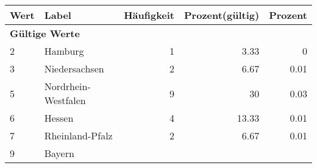      \begin{longtable}{lXrrr}
     \toprule
     \textbf{Wert} & \textbf{Label} & \textbf{Häufigkeit} & \textbf{Prozent(gültig)} & \textbf{Prozent} \\
     \endhead
     \midrule
     \multicolumn{5}{l}{\textbf{Gültige Werte}}\\

     2 &
     \multicolumn{1}{X}{ Hamburg   } &


       \num{1} &
       \num[round-mode=places,round-precision=2]{3,33} &
         \num[round-mode=places,round-precision=2]{0} \\

     3 &
     \multicolumn{1}{X}{ Niedersachsen   } &


       \num{2} &
       \num[round-mode=places,round-precision=2]{6,67} &
         \num[round-mode=places,round-precision=2]{0,01} \\

     5 &
     \multicolumn{1}{X}{ Nordrhein-Westfalen   } &


       \num{9} &
       \num[round-mode=places,round-precision=2]{30} &
         \num[round-mode=places,round-precision=2]{0,03} \\

     6 &
     \multicolumn{1}{X}{ Hessen   } &


       \num{4} &
       \num[round-mode=places,round-precision=2]{13,33} &
         \num[round-mode=places,round-precision=2]{0,01} \\

     7 &
     \multicolumn{1}{X}{ Rheinland-Pfalz   } &


       \num{2} &
       \num[round-mode=places,round-precision=2]{6,67} &
         \num[round-mode=places,round-precision=2]{0,01} \\

     9 &
     \multicolumn{1}{X}{ Bayern   } &



\end{longtable}
